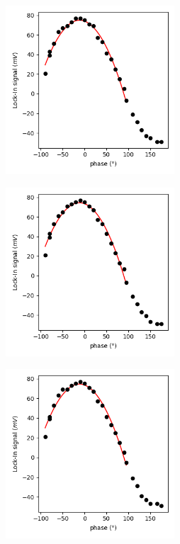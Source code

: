 \documentclass{article}
\begin{document}
 \begin{figure}[H]
  \begin{subfigure}[b]{6.3cm}
      \centering
      \includegraphics[width=6.3cm]{../results/lock_In_phase_plot(Noiseoff).png}
      \caption{}
  \end{subfigure}
  \hfill
  \begin{subfigure}[b]{6.3cm}
    \centering
    \includegraphics[width=6.3cm]{../results/lock_In_phase_plot(Noise10^-4).png}
    \caption{}
\end{subfigure}
\hfill
\begin{subfigure}[b]{6.3cm}
  \centering
  \includegraphics[width=6.3cm]{../results/lock_In_phase_plot(Noise10^-3).png}
  \caption{}
\end{subfigure}

\end{figure}
\end{document}
